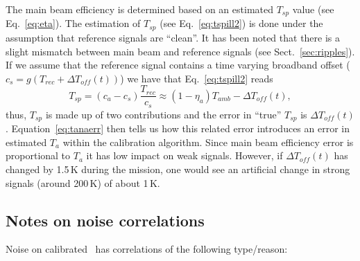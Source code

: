 The main beam efficiency is determined based on an estimated
\(T_{sp}\) value (see Eq.~\ref{eq:eta}).
The estimation of \(T_{sp}\) (see Eq.~\ref{eq:tspill2}) 
is done under the assumption that reference signals are ``clean''.
It has been noted that there is a slight mismatch between
main beam and reference signals (see Sect.~\ref{sec:ripples}).
If we assume that the reference signal contains a time varying
broadband offset (\(c_{s}=g(T_{rec}+\Delta T_{off}(t))\)) 
we have that Eq.~\ref{eq:tspill2} reads
\begin{equation}
 T_{sp}=(c_{a}-c_{s})\frac{T_{rec}}{c_{s}}\approx(1-\eta_{a})T_{amb}-\Delta T_{off}(t),
\end{equation}
thus, \(T_{sp}\) is made up of two contributions and the error
in ``true'' \(T_{sp}\) is \(\Delta T_{off}(t)\).
Equation~\ref{eq:tanaerr} then tells us how this related
error introduces an error in estimated \(T_{a}\) within the calibration algorithm.
Since main beam efficiency error is proportional to \(T_{a}\) it has low impact
on weak signals. However, if \(\Delta T_{off}(t)\) has changed by 1.5\,K
during the mission, one would see an artificial change in strong 
signals (around 200\,K) of about 1\,K. 




\subsection{Notes on noise correlations}
\label{notesoncorr}

Noise on calibrated \smr\ has correlations of the following type/reason:

